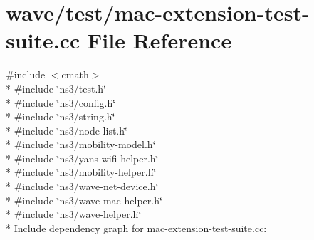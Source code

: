 \hypertarget{mac-extension-test-suite_8cc}{}\section{wave/test/mac-\/extension-\/test-\/suite.cc File Reference}
\label{mac-extension-test-suite_8cc}
{\ttfamily \#include $<$cmath$>$}\\*
{\ttfamily \#include \char`\"{}ns3/test.\+h\char`\"{}}\\*
{\ttfamily \#include \char`\"{}ns3/config.\+h\char`\"{}}\\*
{\ttfamily \#include \char`\"{}ns3/string.\+h\char`\"{}}\\*
{\ttfamily \#include \char`\"{}ns3/node-\/list.\+h\char`\"{}}\\*
{\ttfamily \#include \char`\"{}ns3/mobility-\/model.\+h\char`\"{}}\\*
{\ttfamily \#include \char`\"{}ns3/yans-\/wifi-\/helper.\+h\char`\"{}}\\*
{\ttfamily \#include \char`\"{}ns3/mobility-\/helper.\+h\char`\"{}}\\*
{\ttfamily \#include \char`\"{}ns3/wave-\/net-\/device.\+h\char`\"{}}\\*
{\ttfamily \#include \char`\"{}ns3/wave-\/mac-\/helper.\+h\char`\"{}}\\*
{\ttfamily \#include \char`\"{}ns3/wave-\/helper.\+h\char`\"{}}\\*
Include dependency graph for mac-\/extension-\/test-\/suite.cc\+:
